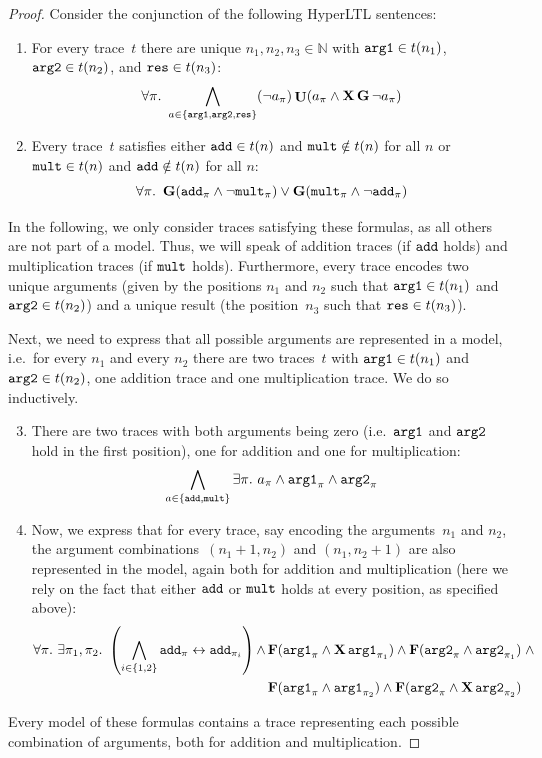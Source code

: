 \documentclass[dvipsnames,10pt,a4paper]{amsart}
\theoremstyle{definition}
\theoremstyle{remark}
\newcommand{\set}[1]{\{#1\}}
\newcommand{\nats}{\mathbb{N}}
\newcommand{\F}{\mathop{\mathbf{F}\vphantom{a}}\nolimits}
\newcommand{\G}{\mathop{\mathbf{G}\vphantom{a}}\nolimits}
\DeclareMathOperator{\U}{\mathbf{U}}
\newcommand{\X}{\mathop{\mathbf{X}\vphantom{a}}\nolimits}
\newcommand{\hyltl}{{HyperLTL}\xspace}
\newcommand\argl{\textup{\texttt{arg1}}}
\newcommand\argr{\textup{\texttt{arg2}}}
\newcommand\res{\textup{\texttt{res}}}
\newcommand\add{\textup{\texttt{add}}}
\newcommand\mult{\textup{\texttt{mult}}}
\begin{document}
\begin{proof}
Consider the conjunction of the following \hyltl sentences:
\begin{enumerate}

	\item For every trace~$t$ there are unique $n_1,n_2,n_3 \in \nats$ with $\argl \in t(n_1)$,
    $\argr \in t(n_2)$, and $\res \in t(n_3)$:
\[
		\forall \pi.\ \bigwedge_{a \in \set{\argl,\argr,\res}}(\neg a_\pi)\U (a_\pi \wedge \X\G\neg a_\pi)
\]

	\item Every trace~$t$ satisfies either $\add \in t(n)$ and $\mult\notin t(n)$ for all $n$ or $\mult \in t(n)$ and $\add \notin t(n)$ for all $n$:
	\[
	\forall \pi.\ \G(\add_\pi\wedge\neg\mult_\pi) \vee \G(\mult_\pi\wedge\neg\add_\pi)
	\]

\end{enumerate}
	In the following, we only consider traces satisfying these formulas, as all others are not part of a model. Thus, we will speak of addition traces (if $\add$ holds) and multiplication traces (if $\mult $ holds).
	Furthermore, every trace encodes two unique arguments (given by the positions $n_1$ and $n_2$ such that $\argl\in t(n_1)$ and $\argr\in t(n_2)$) and a unique result (the position~$n_3$ such that $\res\in t(n_3)$). 
	
Next, we need to express that all possible arguments are represented in a model, i.e.\ for every $n_1$ and every $n_2$ there are two traces~$t$ with $\argl \in t(n_1)$ and $\argr \in t(n_2)$, one addition trace and one multiplication trace.	
	We do so inductively. 
	\begin{enumerate}
\setcounter{enumi}{2}
	
	\item\label{itemcomplstart} 
     There are two traces with both arguments being zero (i.e.\ $\argl$ and $\argr$ hold in the first position), one for addition and one for multiplication:
\[\bigwedge_{a \in \set{\add,\mult}}\exists \pi.\ a_\pi \wedge \argl_\pi \wedge \argr_\pi\]


\item\label{itemcomplstep} Now, we express that for every trace, say encoding the arguments~$n_1$ and $n_2$, the argument combinations~$(n_1+1, n_2)$ and $(n_1, n_2+1)$ are also represented in the model, again both for addition and multiplication (here we rely on the fact that either $\add$ or $\mult$ holds at every position, as specified above):
\begin{align*}
\forall \pi.\ \exists\pi_1, \pi_2.\ \left( \bigwedge_{i \in\set{1,2}} \add_\pi \leftrightarrow \add_{\pi_i} \right)\wedge 
&\F(\argl_\pi \wedge \X\argl_{\pi_1}) \wedge \F(\argr_\pi \wedge \argr_{\pi_1}) \mathrel{\wedge}\\
&
\F(\argl_\pi \wedge \argl_{\pi_2}) \wedge \F(\argr_\pi \wedge \X\argr_{\pi_2})	
\end{align*}  
\end{enumerate}	
Every model of these formulas contains a trace representing each possible combination of arguments, both for addition and multiplication. 


\end{proof}
\end{document}
